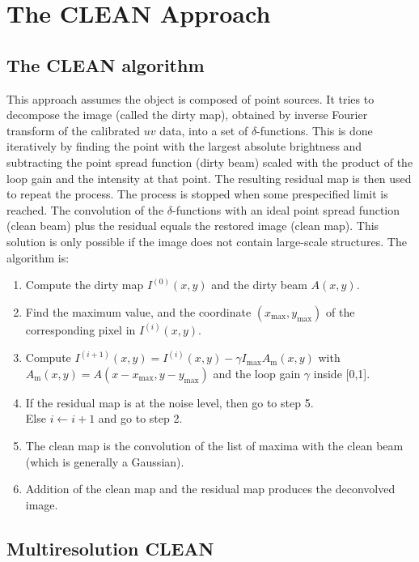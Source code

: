 \section{The CLEAN Approach}
\subsection{The CLEAN algorithm}

This approach assumes the object is composed of point sources.
It tries to decompose the image (called the dirty map), obtained 
by inverse Fourier transform
of the calibrated $uv$ data, into a set of $\delta$-functions. 
This is done iteratively by finding the point with the largest
absolute brightness and subtracting the point spread function (dirty beam)
scaled with the product of the loop gain and the intensity at that
point. The resulting residual map is then used to repeat the
process. The process is stopped when some prespecified limit 
is reached. The convolution of the $\delta$-functions with an ideal 
point spread function 
(clean beam) plus the residual equals the restored image (clean map). 
This solution is only possible if the image does not contain
large-scale structures.  
The algorithm is:
\begin{enumerate}
\item Compute the dirty map  $I^{(0)}(x,y)$ and the dirty beam $A(x,y)$.
\item Find the maximum value, and the coordinate $(x_{\mbox{max}},y_{\mbox{max}})$ of
the corresponding pixel in $I^{(i)}(x,y)$.
\item Compute $I^{(i+1)}(x,y) = I^{(i)}(x,y) - \gamma I_{\mbox{max}} 
A_{\mbox{m}}(x,y)$ 
      with $A_{\mbox{m}}(x,y)= A(x-x_{\mbox{max}}, y-y_{\mbox{max}})$ 
      and the loop gain $\gamma$ inside [0,1].
\item If the residual map is at the noise level, then go to step 5. \\
      Else $i \longleftarrow i+1$ and go to step 2.
\item The clean map is the convolution of the list of maxima 
with the clean beam  (which is generally a Gaussian).
\item Addition of the clean map and the residual map 
  produces the deconvolved image. 
\end{enumerate}

\subsection{Multiresolution CLEAN}

